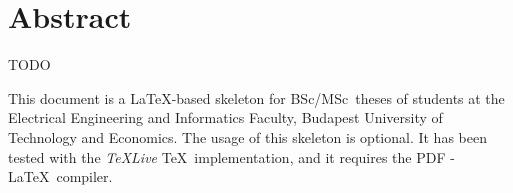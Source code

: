 \setcounter{page}{1}

\selecthungarian




\vfill
\selectenglish


\chapter*{Abstract}
TODO

This document is a \LaTeX-based skeleton for BSc/MSc~theses of students at the Electrical Engineering 
and Informatics Faculty, Budapest University of Technology and Economics. The usage of this skeleton 
is optional. It has been tested with the \emph{TeXLive} \TeX~implementation, and it requires the PDF
-\LaTeX~compiler.


\vfill
\selectthesislanguage

\setcounter{romanPage}{\value{page}}

